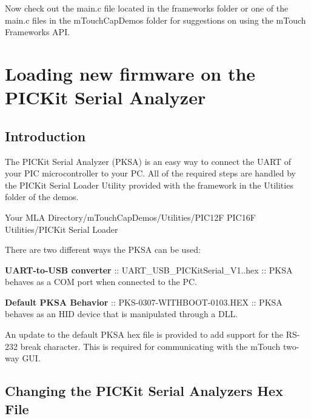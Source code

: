 Now check out the main.\+c file located in the framework\textquotesingle{}s folder or one of the main.\+c files in the m\+Touch\+Cap\+Demos folder for suggestions on using the m\+Touch Framework\textquotesingle{}s A\+P\+I. \hypertarget{PKSARS232}{}\section{Loading new firmware on the P\+I\+C\+Kit Serial Analyzer}\label{PKSARS232}
\hypertarget{index_Intro}{}\subsection{Introduction}\label{index_Intro}
The P\+I\+C\+Kit Serial Analyzer (P\+K\+S\+A) is an easy way to connect the U\+A\+R\+T of your P\+I\+C\textregistered{} microcontroller to your P\+C. All of the required steps are handled by the P\+I\+C\+Kit Serial Loader Utility provided with the framework in the \textquotesingle{}Utilities\textquotesingle{} folder of the demos.

{\ttfamily Your M\+L\+A Directory/m\+Touch\+Cap\+Demos/\+Utilities/\+P\+I\+C12\+F P\+I\+C16\+F Utilities/\+P\+I\+C\+Kit Serial Loader}

There are two different ways the P\+K\+S\+A can be used\+: \begin{DoxyItemize}
\item {\bfseries U\+A\+R\+T-\/to-\/\+U\+S\+B converter} \+:\+: U\+A\+R\+T\+\_\+\+U\+S\+B\+\_\+\+P\+I\+C\+Kit\+Serial\+\_\+\+V1..\+hex \+:\+: P\+K\+S\+A behaves as a C\+O\+M port when connected to the P\+C. \item {\bfseries Default P\+K\+S\+A Behavior} \+:\+: P\+K\+S-\/0307-\/\+W\+I\+T\+H\+B\+O\+O\+T-\/0103.\+H\+E\+X \+:\+: P\+K\+S\+A behaves as an H\+I\+D device that is manipulated through a D\+L\+L.\end{DoxyItemize}
An update to the default P\+K\+S\+A hex file is provided to add support for the R\+S-\/232 \textquotesingle{}break\textquotesingle{} character. This is required for communicating with the m\+Touch two-\/way G\+U\+I.\hypertarget{_p_k_s_a_r_s232_Convert}{}\subsection{Changing the P\+I\+C\+Kit Serial Analyzer\textquotesingle{}s Hex File}\label{_p_k_s_a_r_s232_Convert}

